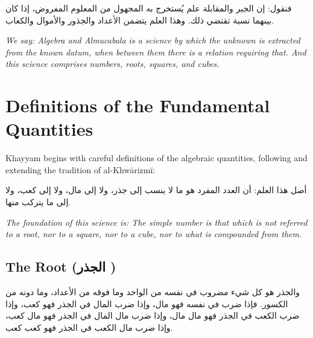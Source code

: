 \begin{Arabic}
فنقول: إن الجبر والمقابلة علم يُستخرج به المجهول من المعلوم المفروض، إذا كان بينهما نسبة تقتضي ذلك. وهذا العلم يتضمن الأعداد والجذور والأموال والكعاب.

\end{Arabic}

\textit{We say: Algebra and Almucabala is a science by which the unknown is extracted from the known datum, when between them there is a relation requiring that.
And this science comprises numbers, roots, squares, and cubes.}
\clearpage

\section{Definitions of the Fundamental Quantities}

\label{sec:definitions}


Khayyam begins with careful definitions of the algebraic quantities, following and extending the tradition of al-Khwārizmī:

\begin{definitionbar}

\begin{Arabic}
أصل هذا العلم: أن العدد المفرد هو ما لا ينسب إلى جذر، ولا إلى مال، ولا إلى كعب، ولا إلى ما يتركب منها.

\end{Arabic}

\textit{The foundation of this science is: The simple number is that which is not referred to a root, nor to a square, nor to a cube, nor to what is compounded from them.}

\end{definitionbar}

\subsection{The Root (\textarabic{الجذر}
)}
\label{subsec:root}

\begin{Arabic}
والجذر هو كل شيء مضروب في نفسه من الواحد وما فوقه من الأعداد، وما دونه من الكسور. فإذا ضرب في نفسه فهو مال، وإذا ضرب المال في الجذر فهو كعب، وإذا ضرب الكعب في الجذر فهو مال مال، وإذا ضرب مال المال في الجذر فهو مال كعب، وإذا ضرب مال الكعب في الجذر فهو كعب كعب.

\end{Arabic}

